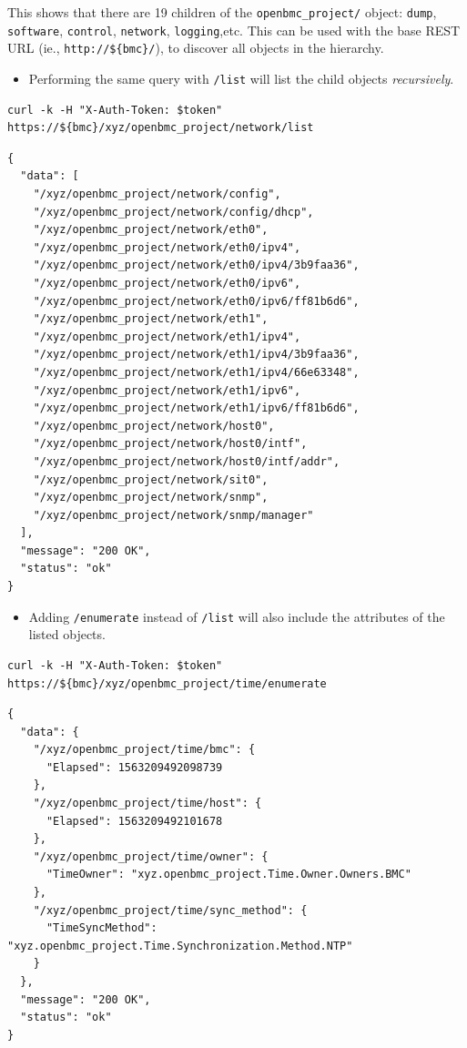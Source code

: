 This shows that there are 19 children of the \texttt{openbmc\_project/}
object: \texttt{dump}, \texttt{software}, \texttt{control},
\texttt{network}, \texttt{logging},etc. This can be used with the base
REST URL (ie., \texttt{http://\$\{bmc\}/}), to discover all objects in
the hierarchy.

\begin{itemize}
\tightlist
\item
  Performing the same query with \texttt{/list} will list the child
  objects \emph{recursively}.
\end{itemize}

\begin{verbatim}
curl -k -H "X-Auth-Token: $token" https://${bmc}/xyz/openbmc_project/network/list
\end{verbatim}

\begin{verbatim}
{
  "data": [
    "/xyz/openbmc_project/network/config",
    "/xyz/openbmc_project/network/config/dhcp",
    "/xyz/openbmc_project/network/eth0",
    "/xyz/openbmc_project/network/eth0/ipv4",
    "/xyz/openbmc_project/network/eth0/ipv4/3b9faa36",
    "/xyz/openbmc_project/network/eth0/ipv6",
    "/xyz/openbmc_project/network/eth0/ipv6/ff81b6d6",
    "/xyz/openbmc_project/network/eth1",
    "/xyz/openbmc_project/network/eth1/ipv4",
    "/xyz/openbmc_project/network/eth1/ipv4/3b9faa36",
    "/xyz/openbmc_project/network/eth1/ipv4/66e63348",
    "/xyz/openbmc_project/network/eth1/ipv6",
    "/xyz/openbmc_project/network/eth1/ipv6/ff81b6d6",
    "/xyz/openbmc_project/network/host0",
    "/xyz/openbmc_project/network/host0/intf",
    "/xyz/openbmc_project/network/host0/intf/addr",
    "/xyz/openbmc_project/network/sit0",
    "/xyz/openbmc_project/network/snmp",
    "/xyz/openbmc_project/network/snmp/manager"
  ],
  "message": "200 OK",
  "status": "ok"
}
\end{verbatim}

\begin{itemize}
\tightlist
\item
  Adding \texttt{/enumerate} instead of \texttt{/list} will also include
  the attributes of the listed objects.
\end{itemize}

\begin{verbatim}
curl -k -H "X-Auth-Token: $token" https://${bmc}/xyz/openbmc_project/time/enumerate
\end{verbatim}

\begin{verbatim}
{
  "data": {
    "/xyz/openbmc_project/time/bmc": {
      "Elapsed": 1563209492098739
    },
    "/xyz/openbmc_project/time/host": {
      "Elapsed": 1563209492101678
    },
    "/xyz/openbmc_project/time/owner": {
      "TimeOwner": "xyz.openbmc_project.Time.Owner.Owners.BMC"
    },
    "/xyz/openbmc_project/time/sync_method": {
      "TimeSyncMethod": "xyz.openbmc_project.Time.Synchronization.Method.NTP"
    }
  },
  "message": "200 OK",
  "status": "ok"
}
\end{verbatim}

